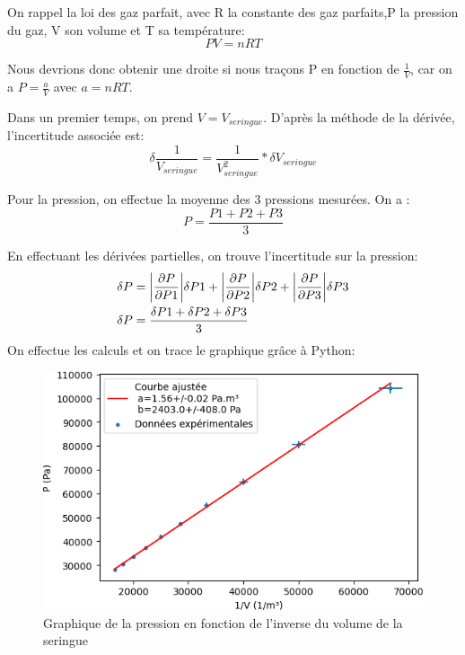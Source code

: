 \documentclass[12pt]{article}
\begin{document}
On rappel la loi des gaz parfait, avec R la constante des gaz parfaits,P la pression du gaz, V son volume et T sa température:
\begin{equation}
PV=nRT
\end{equation}

Nous devrions donc obtenir une droite si nous traçons P en fonction de $\frac{1}{V}$, car on a $P=\frac{a}{V}$ avec $a=nRT$.  

Dans un premier temps, on prend $V=V_{seringue}$. D'après la méthode de la dérivée, l'incertitude associée est:
\begin{equation}
\delta \frac{1}{V_{seringue}}=\frac{1}{V_{seringue}^2}*\delta V_{seringue}
\end{equation}

Pour la pression, on effectue la moyenne des 3 pressions mesurées. On a :
\begin{equation}
P=\frac{P1+P2+P3}{3}
\end{equation}

En effectuant les dérivées partielles, on trouve l'incertitude sur la pression:
\begin{align*}
\delta P &= \abs{\frac{\partial P}{\partial P1}} \delta P1 +\abs{\frac{\partial P}{\partial P2}} \delta P2 +\abs{\frac{\partial P}{\partial P3}} \delta P3 \\
\delta P &= \frac{\delta P1 +\delta P2 +\delta P3}{3}
\end{align*}
\newpage
On effectue les calculs et on trace le graphique grâce à Python:
\begin{figure}[h!]
	\begin{center}
		\includegraphics[scale=1]{img/GExp1.png}
		\caption{Graphique de la pression en fonction de l'inverse du volume de la seringue}
	\end{center}
\end{figure}
\end{document}
